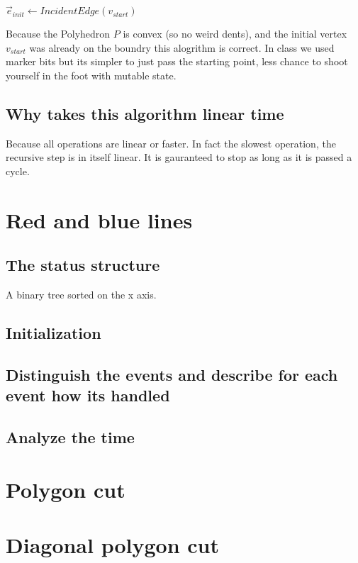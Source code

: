 \documentclass{article}
\begin{document}
\begin{empfile}
\begin{algorithmic}
		\State \Return {}
	\EndIf
	\State
	\Return {}
	\EndFunction
	\State
	\State $\vec{e}_{init} \gets IncidentEdge(v_{start})$
	\State
	\State \Return
	\EndFunction
	\State 
\end{algorithmic}

Because the Polyhedron $P$ is convex (so no weird dents), and
the initial vertex $v_{start}$ was already on the boundry this
alogrithm is correct.
In class we used marker bits but its simpler to just pass the
starting point, less chance to shoot yourself in the foot with
mutable state.

\subsection{Why takes this algorithm linear time}
Because all operations are linear or faster. In fact the slowest
operation, the recursive step is in itself linear. It is gauranteed to stop
as long as it is passed a cycle.

\section{Red and blue lines}
\subsection{The status structure}
A binary tree sorted on the x axis.
\subsection{Initialization}

\subsection{Distinguish the events and describe for each event how its handled}
\subsection{Analyze the time}
\section{Polygon cut}
\section{Diagonal polygon cut}
\end{empfile}
\end{document}
